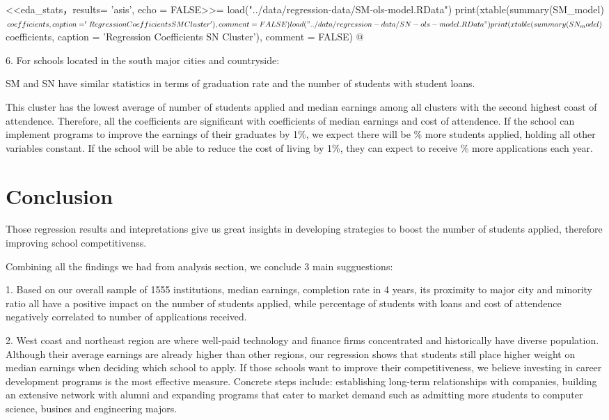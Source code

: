 \documentclass{article}
\begin{document}
<<eda_stats，results= 'asis', echo = FALSE>>=
load("../data/regression-data/SM-ols-model.RData")
print(xtable(summary(SM_model)$coefficients, caption = 'Regression Coefficients SM Cluster'), comment = FALSE)
load("../data/regression-data/SN-ols-model.RData")
print(xtable(summary(SN_model)$coefficients, caption = 'Regression Coefficients SN Cluster'), comment = FALSE)
@

6. For schools located in the south major cities and countryside:

SM and SN have similar statistics in terms of graduation rate and the number of students with student loans.

This cluster has the lowest average of number of students applied and median earnings among all clusters with the second highest coast of attendence. Therefore, all the coefficients are significant with coefficients of median earnings and cost of attendence. If the school can implement programs to improve the earnings of their graduates by 1\%, we expect there will be \% more students applied, holding all other variables constant. If the school will be able to reduce the cost of living by 1\%, they can expect to receive \% more applications each year.


\section{Conclusion}

Those regression results and intepretations give us great insights in developing strategies to boost the number of students applied, therefore improving school competitivenss. 

Combining all the findings we had from analysis section, we conclude 3 main sugguestions:

1. Based on our overall sample of 1555 institutions, median earnings, completion rate in 4 years, its proximity to major city and minority ratio all have a positive impact on the number of students applied, while percentage of students with loans and cost of attendence negatively correlated to number of applications received. 

2. West coast and northeast region are where well-paid technology and finance firms concentrated and historically have diverse population. Although their average earnings are already higher than other regions, our regression shows that students still place higher weight on median earnings when deciding which school to apply. If those schools want to improve their competitiveness, we believe investing in career development programs is the most effective measure. Concrete steps include: establishing long-term relationships with companies, building an extensive network with alumni and expanding programs that cater to market demand such as admitting more students to computer science, busines and engineering majors. 
\end{document}
